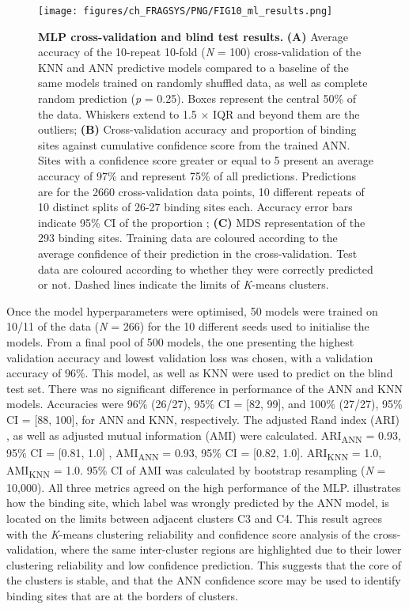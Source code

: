 {\begin{figure}[htb!]
    \centering
    \texttt{[image: figures/ch\_FRAGSYS/PNG/FIG10\_ml\_results.png]}
    \caption[MLP cross-validation and blind test results]{\textbf{MLP cross-validation and blind test results.} \textbf{(A)} Average accuracy of the 10-repeat 10-fold (\textit{N} = 100) cross-validation of the KNN and ANN predictive models compared to a baseline of the same models trained on randomly shuffled data, as well as complete random prediction (\textit{p} = 0.25). Boxes represent the central 50\% of the data. Whiskers extend to 1.5 $\times$ IQR and beyond them are the outliers; \textbf{(B)} Cross-validation accuracy and proportion of binding sites against cumulative confidence score from the trained ANN. Sites with a confidence score greater or equal to 5 present an average accuracy of 97\% and represent 75\% of all predictions. Predictions are for the 2660 cross-validation data points, 10 different repeats of 10 distinct splits of 26-27 binding sites each. Accuracy error bars indicate 95\% CI of the proportion \cite{WILSON_197_PROP_CI}; \textbf{(C)} MDS representation of the 293 binding sites. Training data are coloured according to the average confidence of their prediction in the cross-validation. Test data are coloured according to whether they were correctly predicted or not. Dashed lines indicate the limits of \textit{K}-means clusters.}
    \label{fig:MLP_CV_blind_test}
\end{figure}

Once the model hyperparameters were optimised, 50 models were trained on 10/11 of the data (\textit{N} = 266) for the 10 different seeds used to initialise the models. From a final pool of 500 models, the one presenting the highest validation accuracy and lowest validation loss was chosen, with a validation accuracy of 96\%. This model, as well as KNN were used to predict on the blind test set. There was no significant difference in performance of the ANN and KNN models. Accuracies were 96\% (26/27), 95\% CI = [82, 99], and 100\% (27/27), 95\% CI = [88, 100], for ANN and KNN, respectively. The adjusted Rand index (ARI) \cite{RAND_1971_ARI, HUBERT_1985_ARI}, as well as adjusted mutual information (AMI) \cite{VINH_2009_AMI, VINH_2010_AMI} were calculated. ARI\textsubscript{ANN} = 0.93, 95\% CI = [0.81, 1.0] \cite{STEINLEY_2016_ARI}, AMI\textsubscript{ANN} = 0.93, 95\% CI = [0.82, 1.0]. ARI\textsubscript{KNN} = 1.0, AMI\textsubscript{KNN} = 1.0. 95\% CI of AMI was calculated by bootstrap resampling (\textit{N} = 10,000). All three metrics agreed on the high performance of the MLP.  illustrates how the binding site, which label was wrongly predicted by the ANN model, is located on the limits between adjacent clusters C3 and C4. This result agrees with the \textit{K}-means clustering reliability and confidence score analysis of the cross-validation, where the same inter-cluster regions are highlighted due to their lower clustering reliability and low confidence prediction. This suggests that the core of the clusters is stable, and that the ANN confidence score may be used to identify binding sites that are at the borders of clusters.

}

